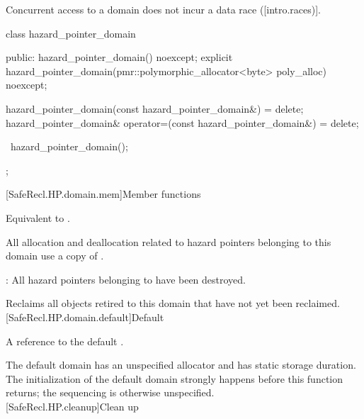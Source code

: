 \pnum
Concurrent access to a domain does not incur a data race ([intro.races)].

\begin{codeblock}
class hazard_pointer_domain {
public:
  hazard_pointer_domain() noexcept;
  explicit hazard_pointer_domain(pmr::polymorphic_allocator<byte> poly_alloc) noexcept;

  hazard_pointer_domain(const hazard_pointer_domain&) = delete;
  hazard_pointer_domain& operator=(const hazard_pointer_domain&) = delete;

  ~hazard_pointer_domain();
};
\end{codeblock}

[SafeRecl.HP.domain.mem]{Member functions}


\pnum
\effects Equivalent to .
\\


\pnum
\remarks All allocation and deallocation related to hazard pointers belonging to this
domain use a copy of .
\\


\pnum
{}: All hazard pointers belonging to  have been destroyed.

\pnum
\effects Reclaims all objects retired to this domain that have not yet been reclaimed.
\\

[SafeRecl.HP.domain.default]{Default }


\pnum
\returns A reference to the default .

\pnum
\remarks The default domain has an unspecified allocator and has static storage
duration. The initialization of the default domain strongly happens before this function
returns; the sequencing is otherwise unspecified.
\\

[SafeRecl.HP.cleanup]{Clean up}

\\
\hspace*{1.1em}


